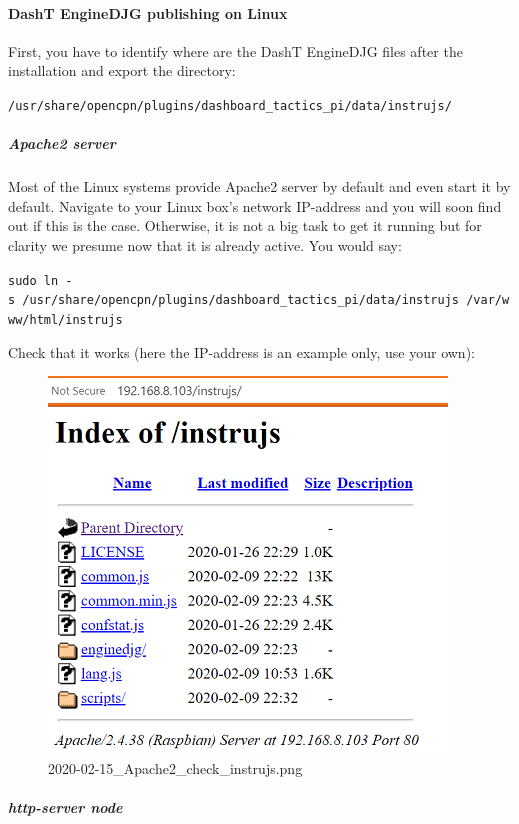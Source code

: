 \documentclass[11pt]{article}
\begin{document}
    \hypertarget{dasht-enginedjg-publishing-on-linux}{%
\paragraph{DashT EngineDJG publishing on
Linux}\label{dasht-enginedjg-publishing-on-linux}}

    First, you have to identify where are the DashT EngineDJG files after
the installation and export the directory:

    \texttt{/usr/share/opencpn/plugins/dashboard\_tactics\_pi/data/instrujs/}

    \hypertarget{apache2-server}{%
\subparagraph{Apache2 server}\label{apache2-server}}

    Most of the Linux systems provide Apache2 server by default and even
start it by default. Navigate to your Linux box's network IP-address and
you will soon find out if this is the case. Otherwise, it is not a big
task to get it running but for clarity we presume now that it is already
active. You would say:

    \texttt{sudo\ ln\ -s\ /usr/share/opencpn/plugins/dashboard\_tactics\_pi/data/instrujs\ /var/www/html/instrujs}

    Check that it works (here the IP-address is an example only, use your
own):

    \begin{figure}
\centering
\includegraphics{2020-02-15_Apache2_check_instrujs.png}
\caption{2020-02-15\_Apache2\_check\_instrujs.png}
\end{figure}

    \hypertarget{http-server-node}{%
\subparagraph{http-server node}\label{http-server-node}}
\end{document}
